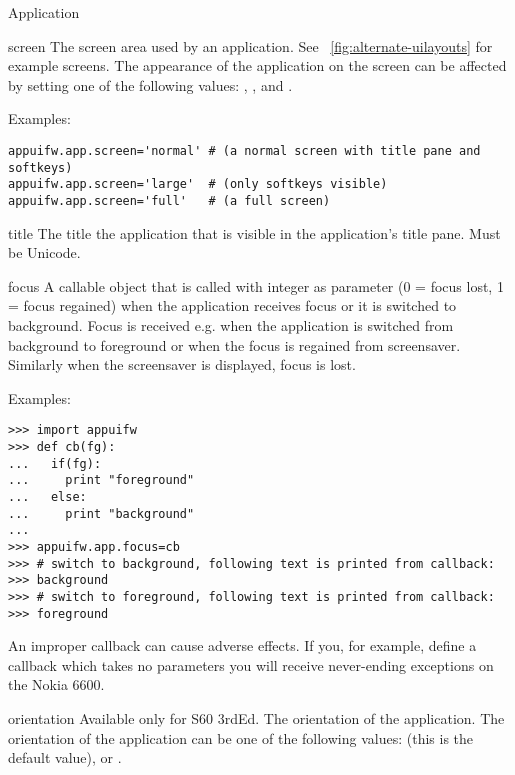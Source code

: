 \begin{classdesc*}{Application}
\begin{memberdesc}[Application]{screen}
The screen area used by an application. See \figurename~\ref{fig:alternate-uilayouts} for
example screens. The appearance of the application on the screen can
be affected by setting one of the following values: ,
, and .

Examples:
\begin{verbatim}
appuifw.app.screen='normal' # (a normal screen with title pane and softkeys)
appuifw.app.screen='large'  # (only softkeys visible)
appuifw.app.screen='full'   # (a full screen)
\end{verbatim}
\end{memberdesc}

\begin{memberdesc}[Application]{title}
The title the application that is visible in the application's title
pane. Must be Unicode.
\end{memberdesc}

\begin{memberdesc}[Application]{focus}
A callable object that is called with integer as parameter (0 = focus lost, 
1 = focus regained) when the application receives focus or it is switched to 
background. Focus is received e.g. when the application is switched from 
background to foreground or when the focus is regained from screensaver. 
Similarly when the screensaver is displayed, focus is lost.

Examples:
\begin{verbatim}
>>> import appuifw
>>> def cb(fg):
...   if(fg):
...     print "foreground"
...   else:
...     print "background"
...
>>> appuifw.app.focus=cb
>>> # switch to background, following text is printed from callback:
>>> background
>>> # switch to foreground, following text is printed from callback:
>>> foreground
\end{verbatim}

\begin{notice}
An improper callback can cause adverse effects. If you, for example,
define a callback which takes no parameters you will receive
never-ending  exceptions on the Nokia 6600.
\end{notice}

\end{memberdesc}

\begin{memberdesc}[Application]{orientation}
Available only for S60 3rdEd. 
The orientation of the application. The orientation of the application can be 
one of the following values:  (this is the default value), 
 or .
\end{memberdesc}


\end{classdesc*}
